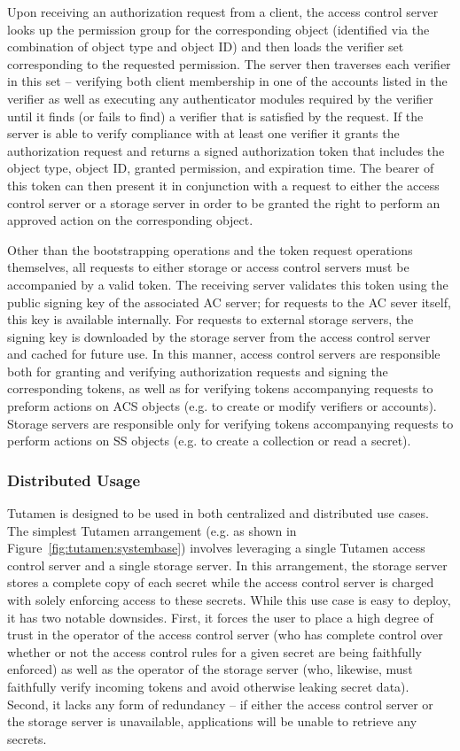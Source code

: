 Upon receiving an authorization request from a client, the access
control server looks up the permission group for the corresponding
object (identified via the combination of object type and object ID)
and then loads the verifier set corresponding to the requested
permission. The server then traverses each verifier in this set --
verifying both client membership in one of the accounts listed in the
verifier as well as executing any authenticator modules required by
the verifier until it finds (or fails to find) a verifier that is
satisfied by the request. If the server is able to verify compliance
with at least one verifier it grants the authorization request and
returns a signed authorization token that includes the object type,
object ID, granted permission, and expiration time. The bearer of this
token can then present it in conjunction with a request to either the
access control server or a storage server in order to be granted the
right to perform an approved action on the corresponding object.

Other than the bootstrapping operations and the token request
operations themselves, all requests to either storage or access
control servers must be accompanied by a valid token. The receiving
server validates this token using the public signing key of the
associated AC server; for requests to the AC sever itself, this key is
available internally. For requests to external storage servers, the
signing key is downloaded by the storage server from the access
control server and cached for future use. In this manner, access
control servers are responsible both for granting and verifying
authorization requests and signing the corresponding tokens, as well
as for verifying tokens accompanying requests to preform actions on
ACS objects (e.g. to create or modify verifiers or accounts). Storage
servers are responsible only for verifying tokens accompanying
requests to perform actions on SS objects (e.g. to create a collection
or read a secret).

\subsubsection{Distributed Usage}
\label{sec:tutamen:arch:distributed}

Tutamen is designed to be used in both centralized and distributed use
cases. The simplest Tutamen arrangement (e.g. as shown in
Figure~\ref{fig:tutamen:systembase}) involves leveraging a single
Tutamen access control server and a single storage server. In this
arrangement, the storage server stores a complete copy of each secret
while the access control server is charged with solely enforcing access
to these secrets. While this use case is easy to deploy, it has two
notable downsides. First, it forces the user to place a high degree of
trust in the operator of the access control server (who has complete
control over whether or not the access control rules for a given
secret are being faithfully enforced) as well as the operator of the
storage server (who, likewise, must faithfully verify incoming tokens
and avoid otherwise leaking secret data). Second, it lacks any form of
redundancy -- if either the access control server or the storage server
is unavailable, applications will be unable to retrieve any secrets.

